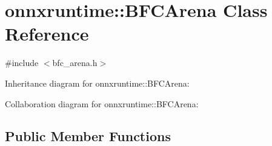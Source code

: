 \hypertarget{classonnxruntime_1_1BFCArena}{}\section{onnxruntime\+:\+:B\+F\+C\+Arena Class Reference}
\label{classonnxruntime_1_1BFCArena}


{\ttfamily \#include $<$bfc\+\_\+arena.\+h$>$}



Inheritance diagram for onnxruntime\+:\+:B\+F\+C\+Arena\+:


Collaboration diagram for onnxruntime\+:\+:B\+F\+C\+Arena\+:
\subsection*{Public Member Functions}
